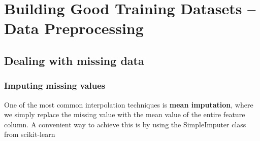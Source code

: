 \chapter{Building Good Training Datasets – Data Preprocessing}
\section{Dealing with missing data}
\subsection{Imputing missing values}
One of the most common interpolation techniques is \textbf{mean imputation}, where we simply replace the missing value with the mean value of the entire feature column. A convenient way to achieve this is by using the SimpleImputer class from scikit-learn